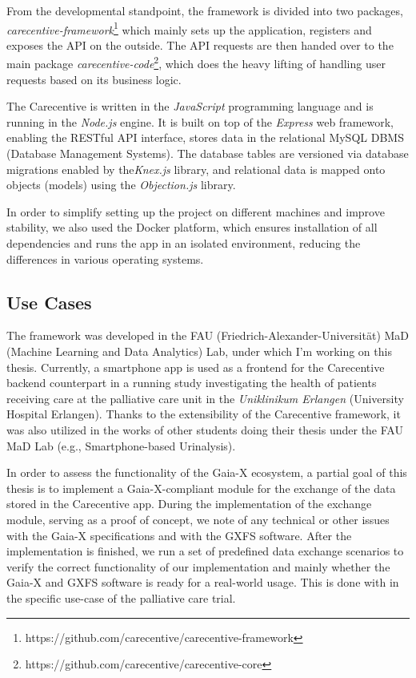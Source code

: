 From the developmental standpoint, the framework is divided into two packages, \textit{carecentive-framework}\footnote{https://github.com/carecentive/carecentive-framework} which mainly sets up the application, registers and exposes the API on the outside.
The API requests are then handed over to the main package \textit{carecentive-code}\footnote{https://github.com/carecentive/carecentive-core}, which does the heavy lifting of handling user requests based on its business logic.

The Carecentive is written in the \textit{JavaScript} programming language and is running in the \textit{Node.js} engine.
It is built on top of the \textit{Express} web framework, enabling the RESTful API interface, stores data in the relational MySQL DBMS (Database Management Systems).
The database tables are versioned via database migrations enabled by the\textit{Knex.js} library, and relational data is mapped onto objects (models) using the \textit{Objection.js} library.

In order to simplify setting up the project on different machines and improve stability, we also used the Docker platform, which ensures installation of all dependencies and runs the app in an isolated environment, reducing the differences in various operating systems.

\subsection{Use Cases}\label{subsec:use-cases}

The framework was developed in the FAU (Friedrich-Alexander-Universität) MaD (Machine Learning and Data Analytics) Lab, under which I'm working on this thesis.
Currently, a smartphone app is used as a frontend for the Carecentive backend counterpart in a running study investigating the health of patients receiving care at the palliative care unit in the \textit{Uniklinikum Erlangen} (University Hospital Erlangen).
Thanks to the extensibility of the Carecentive framework, it was also utilized in the works of other students doing their thesis under the FAU MaD Lab (e.g., Smartphone-based Urinalysis).


In order to assess the functionality of the Gaia-X ecosystem, a partial goal of this thesis is to implement a Gaia-X-compliant module for the exchange of the data stored in the Carecentive app.
During the implementation of the exchange module, serving as a proof of concept, we note of any technical or other issues with the Gaia-X specifications and with the GXFS software.
After the implementation is finished, we run a set of predefined data exchange scenarios to verify the correct functionality of our implementation and mainly whether the Gaia-X and GXFS software is ready for a real-world usage.
This is done with in the specific use-case of the palliative care trial.

